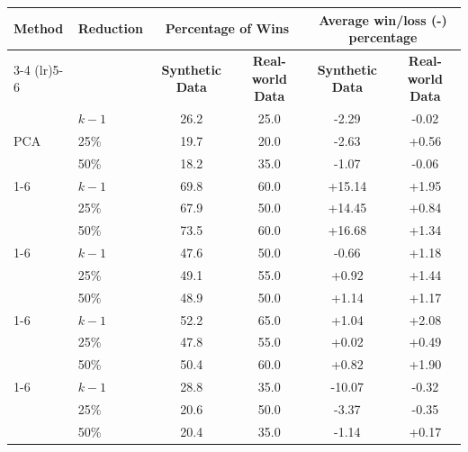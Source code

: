 \begin{tabular}{l l cc cc}
\toprule
\textbf{Method} & \textbf{Reduction} & \multicolumn{2}{c}{\textbf{Percentage of Wins}} & \multicolumn{2}{c}{\textbf{Average win/loss (-) percentage}} \\
\cmidrule(lr){3-4} \cmidrule(lr){5-6}
& & \textbf{Synthetic Data} & \textbf{Real-world Data} & \textbf{Synthetic Data} & \textbf{Real-world Data} \\
\midrule
\multirow{3}{*}{PCA} & $k-1$ & 26.2 & 25.0 & -2.29 & -0.02 \\
 & 25\% & 19.7 & 20.0 & -2.63 & +0.56 \\
 & 50\% & 18.2 & 35.0 & -1.07 & -0.06 \\
\cmidrule(lr){1-6}
\multirow{3}{*}{Kernel PCA} & $k-1$ & 69.8 & 60.0 & +15.14 & +1.95 \\
 & 25\% & 67.9 & 50.0 & +14.45 & +0.84 \\
 & 50\% & 73.5 & 60.0 & +16.68 & +1.34 \\
\cmidrule(lr){1-6}
\multirow{3}{*}{VAE} & $k-1$ & 47.6 & 50.0 & -0.66 & +1.18 \\
 & 25\% & 49.1 & 55.0 & +0.92 & +1.44 \\
 & 50\% & 48.9 & 50.0 & +1.14 & +1.17 \\
\cmidrule(lr){1-6}
\multirow{3}{*}{Isomap} & $k-1$ & 52.2 & 65.0 & +1.04 & +2.08 \\
 & 25\% & 47.8 & 55.0 & +0.02 & +0.49 \\
 & 50\% & 50.4 & 60.0 & +0.82 & +1.90 \\
\cmidrule(lr){1-6}
\multirow{3}{*}{MDS} & $k-1$ & 28.8 & 35.0 & -10.07 & -0.32 \\
 & 25\% & 20.6 & 50.0 & -3.37 & -0.35 \\
 & 50\% & 20.4 & 35.0 & -1.14 & +0.17 \\
\bottomrule\end{tabular}
